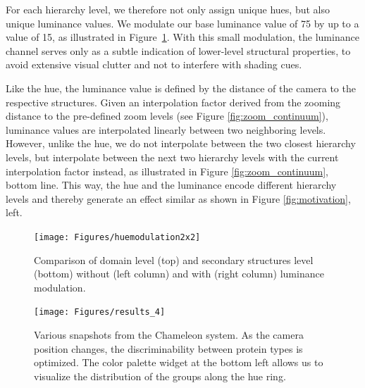 \documentclass{egpubl}
\begin{document}
	
	For each hierarchy level, we therefore not only assign unique hues, but also unique luminance values. 
	We modulate our base luminance value of 75 by up to a value of 15, as illustrated in Figure~\ref{fig:results_2}.  
	With this small modulation, the luminance channel serves only as a subtle indication of lower-level structural properties, to avoid extensive visual clutter and not to interfere with shading cues.  
	
	Like the hue, the luminance value is defined by the distance of the camera to the respective structures. 
	Given an interpolation factor derived from the zooming distance to the pre-defined zoom levels (see Figure \ref{fig:zoom_continuum}), luminance values are interpolated linearly between two neighboring levels. 
	However, unlike the hue, we do not interpolate between the two closest hierarchy levels, but interpolate between the next two hierarchy levels with the current interpolation factor instead, as illustrated in Figure \ref{fig:zoom_continuum}, bottom line. 
	This way, the hue and the luminance encode different hierarchy levels and thereby generate an effect similar as shown in Figure \ref{fig:motivation}, left. 
				
	\begin{figure}[t]
		\centering
		\texttt{[image: Figures/huemodulation2x2]}
		\caption{Comparison of domain level (top) and secondary structures level (bottom) without (left column) and with (right column) luminance modulation. }
		\label{fig:results_2}
	\end{figure}
	
	\begin{figure}[t]
		\centering
		\texttt{[image: Figures/results\_4]}
		\caption{Various snapshots from the Chameleon system.
			As the camera position changes, the discriminability between protein types is optimized.
			The color palette widget at the bottom left allows us to visualize the distribution of the groups along the hue ring.}
		\label{fig:results_1}
	\end{figure}
	
\end{document}
